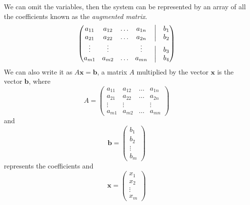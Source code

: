 \documentclass[a4paper]{article}
\theoremstyle{definition}
\begin{document}
We can omit the variables, then the system can be represented by 
an array of all the coefficients known as the \emph{augmented matrix}.
\begin{equation*}
     \begin{pmatrix}
          a_{11} & a_{12} & \ldots & a_{1n} &\bigm| & b_1 \\
          a_{21} & a_{22} & \ldots & a_{2n} &\bigm| & b_2 \\
          \vdots & \vdots &        & \vdots &\bigm| & b_3 \\ 
          a_{m1} & a_{m2} & \ldots & a_{mn} &\bigm| & b_4
      \end{pmatrix}
\end{equation*}
We can also write it as $A\mathrm{\textbf{x}}=\mathrm{\textbf{b}}$, 
a matrix $A$ multiplied by the vector $\mathrm{\textbf{x}}$ is the 
vector $\mathrm{\textbf{b}}$, where
\begin{equation*}
     A =
     \begin{pmatrix}
          a_{11} & a_{12} & \ldots & a_{1n}   \\
          a_{21} & a_{22} & \ldots & a_{2n}  \\
          \vdots & \vdots &        & \vdots  \\ 
          a_{m1} & a_{m2} & \ldots & a_{mn} 
      \end{pmatrix}
\end{equation*}
and
\begin{equation*}
      \mathrm{\textbf{b}} =
     \begin{pmatrix}
          b_{1}   \\
          b_{2}    \\
          \vdots    \\ 
          b_{m}   
      \end{pmatrix}
\end{equation*}
represents the coefficients and
\begin{equation*}
     \mathrm{\textbf{x}} =
    \begin{pmatrix}
         x_{1}   \\
         x_{2}    \\
         \vdots    \\ 
         x_{m}   
     \end{pmatrix}
\end{equation*}
\end{document}
